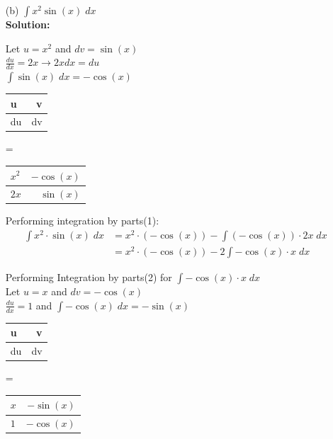 \documentclass[a4paper]{article}
\begin{document}
\begin{enumerate}
\begin{enumerate}
	\item[(b)] $\int x^2 \sin(x) \; dx$\\
	\textbf{Solution:}
	
	
Let $u = x^2$ and $dv = \sin(x)$\\
$\frac{du}{dx} = 2x \rightarrow 2xdx = du$\\	
$\int \sin(x) \; dx = - \cos(x)$

	
\begin{center}
 \begin{tabular}{ l | r }
    \hline
    u & v \\ \hline 
    du & dv \\
    \hline
  \end{tabular}
  = 
 \begin{tabular}{ l | r }
    \hline
    $x^2$ & $- \cos(x)$ \\ \hline 
    $2x$ & $\sin(x)$ \\
    \hline
  \end{tabular}

\end{center}	
	
Performing integration by parts(1):\\	
	
	
\begin{align*}
	\int x^2 \cdot \sin(x) \; dx &= x^2 \cdot (-\cos(x)) - \int (-\cos(x)) \cdot 2x \; dx\\
	&= x^2 \cdot (-\cos(x)) - 2 \int -\cos(x) \cdot x \; dx
\end{align*}	
	
Performing Integration by parts(2) for $\int - \cos(x) \cdot x \; dx$\\

Let $u = x$ and $dv = -\cos(x)$\\
$\frac{du}{dx} = 1$	and $\int -\cos(x) \; dx = -\sin(x)$\\

\begin{center}
 \begin{tabular}{ l | r }
    \hline
    u & v \\ \hline 
    du & dv \\
    \hline
  \end{tabular}
  = 
 \begin{tabular}{ l | r }
    \hline
    $x$ & $- \sin(x)$ \\ \hline 
    $1$ & $-\cos(x)$ \\
    \hline
  \end{tabular}


\end{center}
\end{enumerate}
\end{enumerate}
\end{document}
